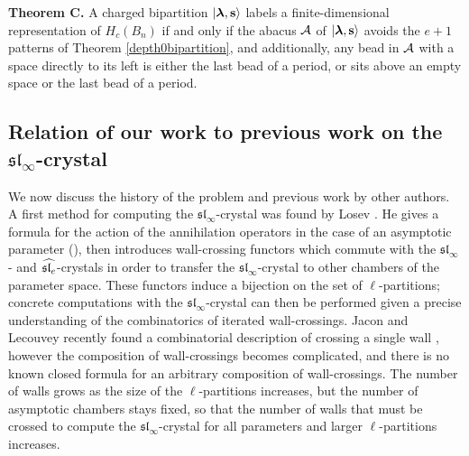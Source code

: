 \documentclass[12pt]{amsart}
\numberwithin{equation}{section}
\theoremstyle{definition}
\newcommand{\slinf}{\mathfrak{sl}_\infty}
\newcommand{\mbs}{\mathbf{s}}
\begin{document}
\medskip

\textbf{Theorem C.} A charged bipartition $|\bla,\mbs\rangle$ labels a finite-dimensional representation of $H_c(B_n)$ if and only if the abacus $\mathcal{A}$ of $|\bla,\mbs\rangle$ avoids
the $e+1$ patterns of Theorem \ref{depth0bipartition}, and additionally, any bead in $\mathcal{A}$ with a space directly to its left is either the last bead of a period, or sits above an empty space or the last bead of a period.

\medskip

\subsection*{Relation of our work to previous work on the $\slinf$-crystal}
We now discuss the history of the problem and previous work by other authors. A first method for computing the $\slinf$-crystal was found by Losev \cite{Losev2015}. He gives a formula for the action of the annihilation operators in the case of an asymptotic parameter (\cite[Proposition 1.1]{Losev2015}), then introduces wall-crossing functors which commute with the $\slinf$- and $\widehat{\mathfrak{sl}_e}$-crystals in order to transfer the $\slinf$-crystal to other chambers of the parameter space. These functors induce a bijection on the set of $\ell$-partitions; concrete computations with the $\slinf$-crystal can then be performed given a precise understanding of the combinatorics of iterated wall-crossings. 
Jacon and Lecouvey recently found a combinatorial description of crossing a single wall \cite{JaconLecouvey2016},
however the composition of wall-crossings becomes complicated, 
and there is no known closed formula for an arbitrary composition of wall-crossings. 
The number of walls grows as the size of the $\ell$-partitions increases, but the number of asymptotic chambers stays fixed, 
so that the number of walls that must be crossed to compute the $\slinf$-crystal for all parameters and larger $\ell$-partitions increases. 
\end{document}
